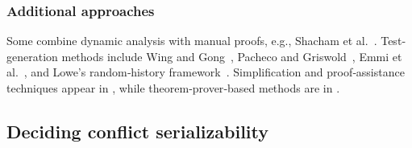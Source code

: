 \subsubsection{Additional approaches}

Some combine dynamic analysis with manual proofs, e.g., Shacham et al.~\cite{ShBrAiSaVeYa11}. Test‐generation methods include Wing and Gong~\cite{WiGo93}, Pacheco and Griswold~\cite{PrGr12,PrGr13}, Emmi et al.~\cite{EmEn17}, and Lowe’s random‐history framework~\cite{Lo17}. Simplification and proof‐assistance techniques appear in \cite{BoEmEnMu17,FeEnMoRiSh18,EnKo24}, while theorem‐prover‐based methods are in \cite{CoDoGr05,DeScWe11}.

%
%
%
%




\subsection{Deciding conflict serializability}

